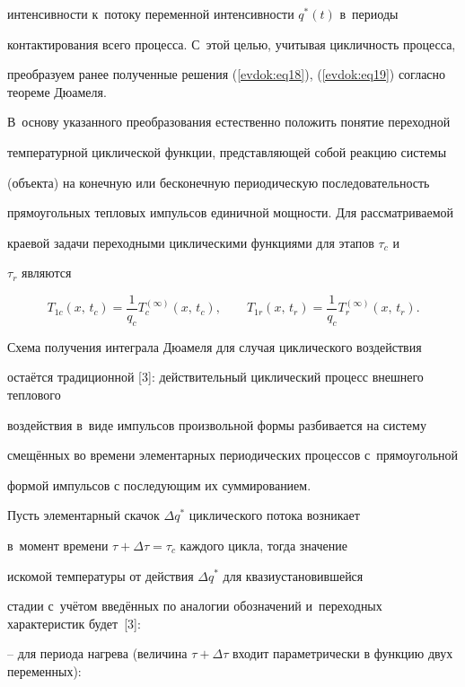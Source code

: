 интенсивности к~потоку переменной интенсивности $q^\ast (t)$ в~периоды 

контактирования всего процесса. С~этой целью, учитывая цикличность процесса, 

преобразуем ранее полученные решения (\ref{evdok:eq18}), (\ref{evdok:eq19}) согласно теореме Дюамеля. 

В~основу указанного преобразования естественно положить понятие переходной 

температурной циклической функции, представляющей собой реакцию системы 

(объекта) на конечную или бесконечную периодическую последовательность 

прямоугольных тепловых импульсов единичной мощности. Для рассматриваемой 

краевой задачи переходными циклическими функциями для этапов $\tau _c $ и~

$\tau _r $ являются 

\[

T_{1c} (x,\,t_c ) = \frac{1}{q_c }T_c^{(\infty )} (x,\,t_c ),\qquad 

T_{1r} (x,\,t_r ) = \frac{1}{q_c }T_r^{(\infty )} (x,\,t_r ).

\]



Схема получения интеграла Дюамеля для случая циклического воздействия 

остаётся традиционной [3]: действительный циклический процесс внешнего теплового 

воздействия в~виде импульсов произвольной формы разбивается на систему 

смещённых во времени элементарных периодических процессов с~прямоугольной 

формой импульсов с последующим их суммированием.



Пусть элементарный скачок $\Delta q^\ast $ циклического потока возникает 

в~момент времени $\tau + \Delta \tau = \tau _c $ каждого цикла, тогда значение 

искомой температуры от действия $\Delta q^\ast $ для квазиустановившейся 

стадии с~учётом введённых по аналогии обозначений и~переходных характеристик будет~[3]:



-- для периода нагрева (величина $\tau+\Delta \tau$ входит параметрически в функцию двух переменных):

